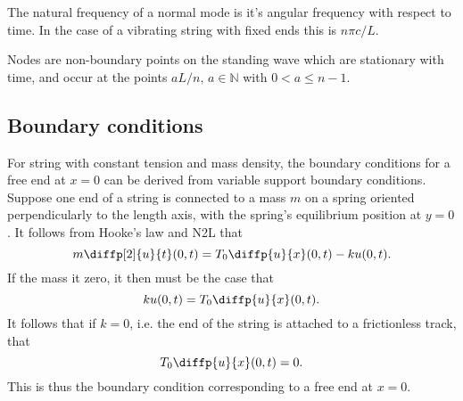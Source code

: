 \documentclass{article}
\begin{document}
\begin{definition}
	The natural frequency of a normal mode is it's angular frequency with respect to time. In the case of a vibrating string with fixed ends this is \(n\pi c/L\).
\end{definition}
\begin{definition}[Node]
	Nodes are non-boundary points on the standing wave which are stationary with time, and occur at the points \(aL/n,\,a\in\mathbb{N}\) with \(0<a\leq n-1\).
\end{definition}
\subsection{Boundary conditions}
For string with constant tension and mass density, the boundary conditions for a free end at \(x=0\) can be derived from variable support boundary conditions. Suppose one end of a string is connected to a mass \(m\) on a spring oriented perpendicularly to the length axis, with the spring's equilibrium position at \(y=0\). It follows from Hooke's law and N2L that
\begin{equation*}
	m\diffp[2]{u}{t}(0,t)=T_0\diffp{u}{x}(0,t)-ku(0,t).
\end{equation*}
If the mass it zero, it then must be the case that
\begin{equation*}
	ku(0,t)=T_0\diffp{u}{x}(0,t).
\end{equation*}
It follows that if \(k=0\), i.e. the end of the string is attached to a frictionless track, that
\begin{equation*}
	T_0\diffp{u}{x}(0,t)=0.
\end{equation*}
This is thus the boundary condition corresponding to a free end at \(x=0\).
\end{document}
